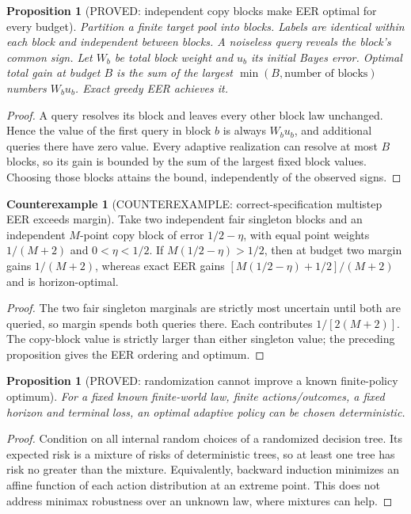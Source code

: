 \documentclass[11pt]{article}
\newtheorem{proposition}[theorem]{Proposition}
\theoremstyle{definition}
\newtheorem{counterexample}[theorem]{Counterexample}
\theoremstyle{remark}
\begin{document}
\begin{proposition}[PROVED: independent copy blocks make EER optimal for every budget]
\label{prop:blocks-r3}
Partition a finite target pool into blocks. Labels are identical within
each block and independent between blocks. A noiseless query reveals
the block's common sign. Let $W_b$ be total block weight and $u_b$
its initial Bayes error. Optimal total gain at budget $B$ is the sum
of the largest $\min(B,\text{number of blocks})$ numbers $W_bu_b$.
Exact greedy EER achieves it.
\end{proposition}
\begin{proof}
A query resolves its block and leaves every other block law unchanged.
Hence the value of the first query in block $b$ is always $W_bu_b$,
and additional queries there have zero value. Every adaptive
realization can resolve at most $B$ blocks, so its gain is bounded
by the sum of the largest fixed block values. Choosing those blocks
attains the bound, independently of the observed signs.
\end{proof}

\begin{counterexample}[COUNTEREXAMPLE: correct-specification multistep EER exceeds margin]
Take two independent fair singleton blocks and an independent
$M$-point copy block of error $1/2-\eta$, with equal point weights
$1/(M+2)$ and $0<\eta<1/2$. If $M(1/2-\eta)>1/2$, then at budget two
margin gains $1/(M+2)$, whereas exact EER gains
$[M(1/2-\eta)+1/2]/(M+2)$ and is horizon-optimal.
\end{counterexample}
\begin{proof}
The two fair singleton marginals are strictly most uncertain until
both are queried, so margin spends both queries there. Each contributes
$1/[2(M+2)]$. The copy-block value is strictly larger than either
singleton value; the preceding proposition gives the EER ordering
and optimum.
\end{proof}

\begin{proposition}[PROVED: randomization cannot improve a known finite-policy optimum]
For a fixed known finite-world law, finite actions/outcomes, a fixed
horizon and terminal loss, an optimal adaptive policy can be chosen
deterministic.
\end{proposition}
\begin{proof}
Condition on all internal random choices of a randomized decision tree.
Its expected risk is a mixture of risks of deterministic trees, so at
least one tree has risk no greater than the mixture. Equivalently,
backward induction minimizes an affine function of each action
distribution at an extreme point. This does not address minimax
robustness over an unknown law, where mixtures can help.
\end{proof}
\end{document}
